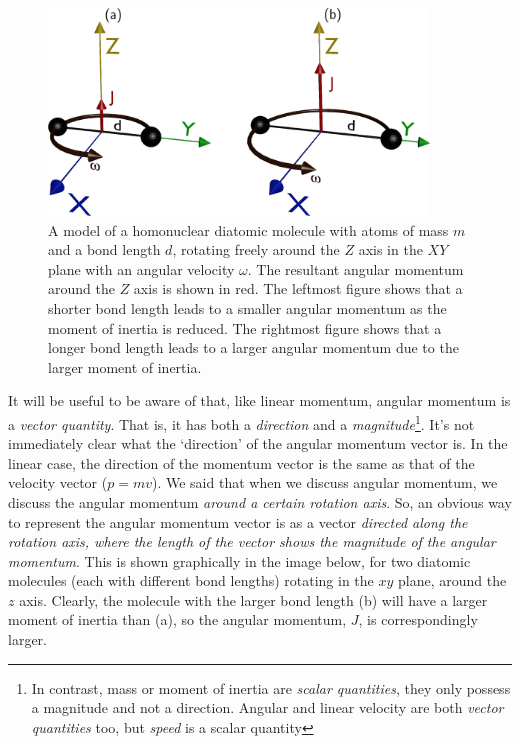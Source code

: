 \documentclass{memoir}[11pt,oneside,a4paper,openany]
\begin{document}
\begin{figure}[h]
	\centering
	\includegraphics[width=0.9\textwidth]{angular_momenta}
	\caption{A model of a homonuclear diatomic molecule with atoms of mass $m$ and a bond length $d$, rotating freely around the $Z$ axis in the $XY$ plane with an angular velocity $\omega$. The resultant angular momentum around the $Z$ axis is shown in red. The leftmost figure shows that a shorter bond length leads to a smaller angular momentum as the moment of inertia is reduced. The rightmost figure shows that a longer bond length leads to a larger angular momentum due to the larger moment of inertia.}\label{fig:angular_momenta}
\end{figure}
It will be useful to be aware of that, like linear momentum, angular momentum is a \emph{vector quantity}. That is, it has both a \emph{direction} and a \emph{magnitude}\footnote{In contrast, mass or moment of inertia are \emph{scalar quantities}, they only possess a magnitude and not a direction. Angular and linear velocity are both \emph{vector quantities} too, but \emph{speed} is a scalar quantity}. It's not immediately clear what the `direction' of the angular momentum vector is. In the linear case, the direction of the momentum vector is the same as that of the velocity vector ($p=mv$). We said that when we discuss angular momentum, we discuss the angular momentum \emph{around a certain rotation axis}. So, an obvious way to represent the angular momentum vector is as a vector \emph{directed along the rotation axis, where the length of the vector shows the magnitude of the angular momentum}. This is shown graphically in the image below, for two diatomic molecules (each with different bond lengths) rotating in the $xy$ plane, around the $z$ axis. Clearly, the molecule with the larger bond length (b) will have a larger moment of inertia than (a), so the angular momentum, $J$, is correspondingly larger. 
\end{document}

